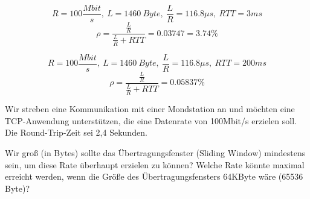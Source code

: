 

\begin{equation}
    R = 100 \frac{Mbit}{s},\ L = 1460\ Byte,\ \frac{L}{R}=116.8\mu s,\ RTT = 3ms
    \label{eq:equation}
\end{equation}
\begin{equation}
    \rho = \frac {\frac{L}{R}} {\frac{L}{R} + RTT} = 0.03747 = 3.74\%
    \label{eq:equation2}
\end{equation}


\begin{equation}
    R = 100 \frac{Mbit}{s},\ L = 1460\ Byte,\ \frac{L}{R}=116.8\mu s,\ RTT = 200ms
    \label{eq:equation3}
\end{equation}
\begin{equation}
    \rho = \frac {\frac{L}{R}} {\frac{L}{R} + RTT} = 0.05837\%
    \label{eq:equation4}
\end{equation}

Wir streben eine Kommunikation mit einer Mondstation an und möchten eine TCP-Anwendung unterstützen, die eine Datenrate von 100Mbit/s erzielen soll. Die Round-Trip-Zeit sei 2,4 Sekunden.

Wir groß (in Bytes) sollte das Übertragungsfenster (Sliding Window) mindestens sein, um diese Rate überhaupt erzielen zu können?
Welche Rate könnte maximal erreicht werden, wenn die Größe des Übertragungsfensters 64KByte wäre (65536 Byte)?